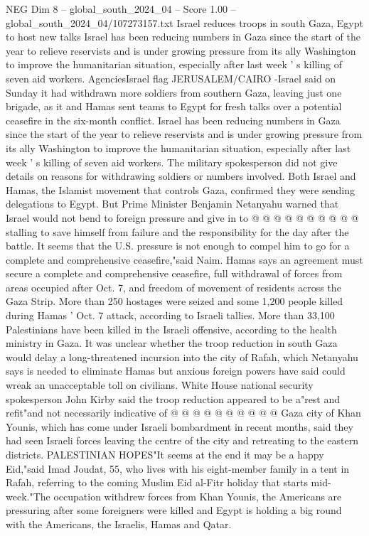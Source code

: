 \begin{textsample}{NEG Dim 8 – global\_south\_2024\_04 – Score 1.00 – global\_south\_2024\_04/107273157.txt}  \label{ex:f8_neg_265}
Israel reduces troops in south Gaza, Egypt to host new talks Israel has been reducing numbers in Gaza since the start of the year to relieve reservists and is under growing pressure from its ally Washington to improve the humanitarian situation, especially after last week ' s killing of seven aid workers.
AgenciesIsrael flag JERUSALEM/CAIRO -Israel said on Sunday it had withdrawn more soldiers from southern Gaza, leaving just one brigade, as it and Hamas sent teams to Egypt for fresh talks over a potential ceasefire in the six-month conflict.
Israel has been reducing numbers in Gaza since the start of the year to relieve reservists and is under growing pressure from its ally Washington to improve the humanitarian situation, especially after last week ' s killing of seven aid workers.
The military spokesperson did not give details on reasons for withdrawing soldiers or numbers involved.
Both Israel and Hamas, the Islamist movement that controls Gaza, confirmed they were sending delegations to Egypt.
But Prime Minister Benjamin Netanyahu warned that Israel would not bend to foreign pressure and give in to @ @ @ @ @ @ @ @ @ @ stalling to save himself from failure and the responsibility for the day after the battle.
It seems that the U.S. pressure is not enough to compel him to go for a complete and comprehensive ceasefire,"said Naim.
Hamas says an agreement must secure a complete and comprehensive ceasefire, full withdrawal of forces from areas occupied after Oct. 7, and freedom of movement of residents across the Gaza Strip.
More than 250 hostages were seized and some 1,200 people killed during Hamas ' Oct. 7 attack, according to Israeli tallies.
More than 33,100 Palestinians have been killed in the Israeli offensive, according to the health ministry in Gaza.
It was unclear whether the troop reduction in south Gaza would delay a long-threatened incursion into the city of Rafah, which Netanyahu says is needed to eliminate Hamas but anxious foreign powers have said could wreak an unacceptable toll on civilians.
White House national security spokesperson John Kirby said the troop reduction appeared to be a"rest and refit"and not necessarily indicative of @ @ @ @ @ @ @ @ @ @ Gaza city of Khan Younis, which has come under Israeli bombardment in recent months, said they had seen Israeli forces leaving the centre of the city and retreating to the eastern districts.
PALESTINIAN HOPES"It seems at the end it may be a happy Eid,"said Imad Joudat, 55, who lives with his eight-member family in a tent in Rafah, referring to the coming Muslim Eid al-Fitr holiday that starts mid-week."The occupation withdrew forces from Khan Younis, the Americans are pressuring after some foreigners were killed and Egypt is holding a big round with the Americans, the Israelis, Hamas and Qatar.

\end{textsample}
